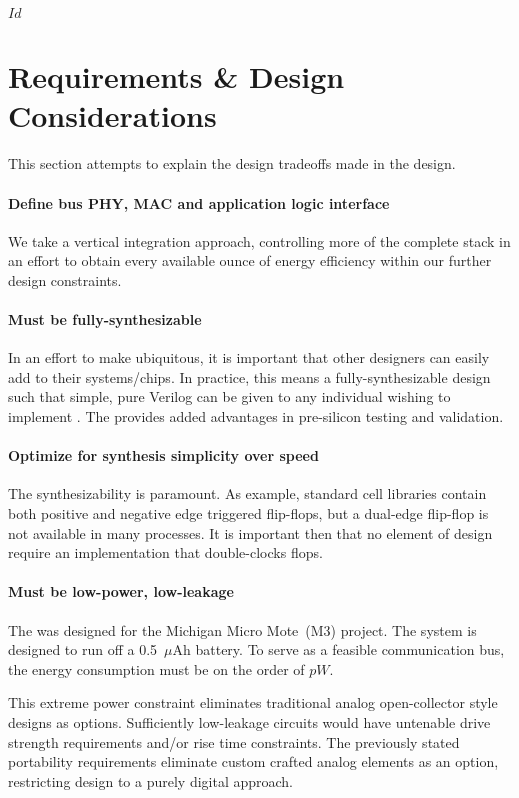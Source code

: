 \svnInfo $Id$

\section{Requirements \& Design Considerations}
\label{sec:requirements}
\label{sec:design}
This section attempts to explain the design tradeoffs made in the \bus design.

\paragraph{Define bus PHY, MAC and application logic interface}
We take a vertical integration approach, controlling more of the complete
stack in an effort to obtain every available ounce of energy efficiency within
our further design constraints.

\paragraph{Must be fully-synthesizable}
In an effort to make \bus ubiquitous, it is important that other designers can
easily add \bus to their systems/chips. In practice, this means a
fully-synthesizable design such that simple, pure Verilog can be given to any
individual wishing to implement \bus. The provides added advantages in
pre-silicon testing and validation.

\paragraph{Optimize for synthesis simplicity over speed}
The synthesizability is paramount. As example, standard cell libraries contain
both positive and negative edge triggered flip-flops, but a dual-edge
flip-flop is not available in many processes. It is important then that no
element of \bus design require an implementation that double-clocks flops.

\paragraph{Must be low-power, low-leakage}
The \bus was designed for the Michigan Micro Mote~(M3) project. The system is
designed to run off a 0.5~$\mu$Ah battery. To serve as a feasible
communication bus, the energy consumption must be on the order of $pW$.

This extreme power constraint eliminates traditional analog open-collector
style designs as options. Sufficiently low-leakage circuits would have
untenable drive strength requirements and/or rise time constraints. The
previously stated portability requirements eliminate custom crafted analog
elements as an option, restricting \bus design to a purely digital approach.

